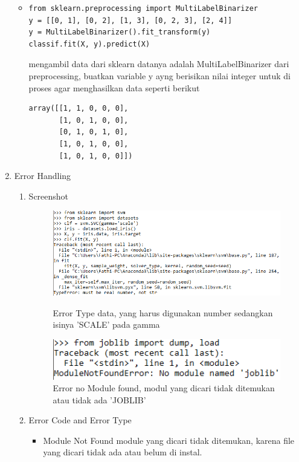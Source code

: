 \begin{enumerate}
\begin{itemize}
\item
\begin{verbatim}
from sklearn.preprocessing import MultiLabelBinarizer
y = [[0, 1], [0, 2], [1, 3], [0, 2, 3], [2, 4]]
y = MultiLabelBinarizer().fit_transform(y)
classif.fit(X, y).predict(X)
\end{verbatim}
\subitem
mengambil data dari sklearn datanya adalah MultiLabelBinarizer dari preprocessing, buatkan variable y ayng berisikan nilai integer untuk di proses agar menghasilkan data seperti berikut
\begin{verbatim}
array([[1, 1, 0, 0, 0],
       [1, 0, 1, 0, 0],
       [0, 1, 0, 1, 0],
       [1, 0, 1, 0, 0],
       [1, 0, 1, 0, 0]])
\end{verbatim}
\end{itemize}

\item
Error Handling
\begin{enumerate}
\item
Screenshot
\begin{figure}
\centerline{\includegraphics[width=1\textwidth]{figures/fathi/20.PNG}}
\caption{Error Type data, yang harus digunakan number sedangkan isinya 'SCALE' pada gamma}
\label{proses20}

\centerline{\includegraphics[width=1\textwidth]{figures/fathi/21.PNG}}
\caption{Error no Module found, modul yang dicari tidak ditemukan atau tidak ada 'JOBLIB'}
\label{proses21}
\end{figure}

\item
Error Code and Error Type
\begin{itemize}
\item
Module Not Found
\subitem
module yang dicari tidak ditemukan, karena file yang dicari tidak ada atau belum di instal.


\end{itemize}
\end{enumerate}
\end{enumerate}
